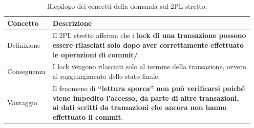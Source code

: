 \documentclass[a4paper]{article}
\newcommand{\dquotes}[1]{``#1''}
\begin{document}
\begin{enumerate}
		\begin{table}[!htp]
			\centering
			\begin{tabular}{@{} l p{25em} @{}}
				\toprule
				Concetto & Descrizione \\
				\midrule
				Definizione & Il 2PL stretto afferma che i \textbf{lock di una transazione possono essere rilasciati solo dopo aver correttamente effettuato le operazioni di \textsf{commit}/\text{abort}}. \\ [.7em]
				Conseguenza & I lock vengono rilasciati solo al termine della transazione, ovvero al raggiungimento dello stato finale. \\ [.7em]
				Vantaggio	& Il fenomeno di \textbf{\dquotes{lettura sporca} non può verificarsi poiché viene impedito l'accesso, da parte di altre transazioni, ai dati scritti da transazioni che ancora non hanno effettuato il \textsf{commit}}. \\ 
				\bottomrule
			\end{tabular}
			\caption{Riepilogo dei concetti della domanda sul 2PL stretto.}
		\end{table}
	\end{enumerate}\newpage
	
\end{document}
